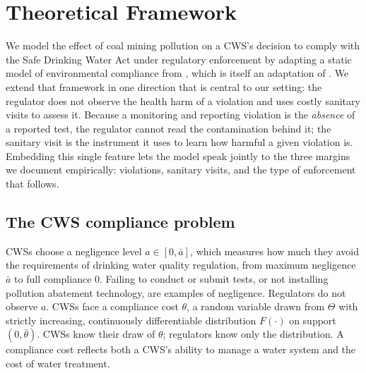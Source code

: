 
\section{Theoretical Framework}

We model the effect of coal mining pollution on a CWS's decision to comply with the Safe Drinking Water Act under regulatory enforcement by adapting a static model of environmental compliance from \cite{kang2021understanding}, which is itself an adaptation of \cite{mookherjee1994marginal}. We extend that framework in one direction that is central to our setting: the regulator does not observe the health harm of a violation and uses costly sanitary visits to assess it. Because a monitoring and reporting violation is the \emph{absence} of a reported test, the regulator cannot read the contamination behind it; the sanitary visit is the instrument it uses to learn how harmful a given violation is. Embedding this single feature lets the model speak jointly to the three margins we document empirically: violations, sanitary visits, and the type of enforcement that follows.

\subsection{The CWS compliance problem}

CWSs choose a negligence level $a \in [0,\bar{a}]$, which measures how much they avoid the requirements of drinking water quality regulation, from maximum negligence $\bar{a}$ to full compliance $0$. Failing to conduct or submit tests, or not installing pollution abatement technology, are examples of negligence. Regulators do not observe $a$. CWSs face a compliance cost $\theta$, a random variable drawn from $\Theta$ with strictly increasing, continuously differentiable distribution $F(\cdot)$ on support $(0,\bar{\theta})$. CWSs know their draw of $\theta$; regulators know only the distribution. A compliance cost reflects both a CWS's ability to manage a water system and the cost of water treatment.

